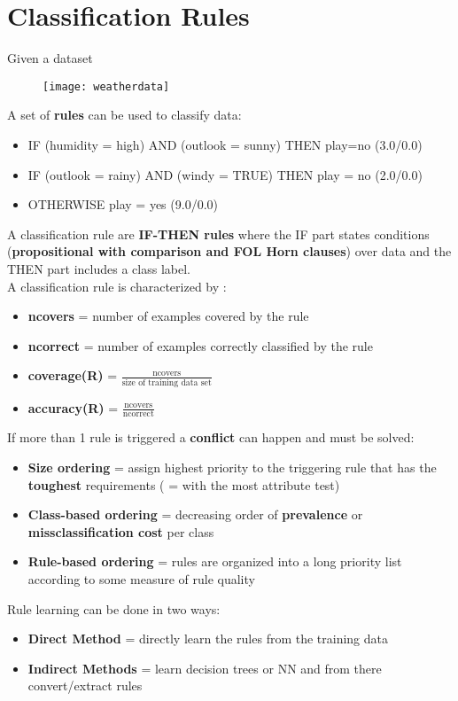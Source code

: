 \newpage
\section{Classification Rules}
Given a dataset
\begin{figure}[H]
  \centering
  \texttt{[image: weatherdata]}
\end{figure}
A set of \textbf{rules} can be used to classify data:
\begin{itemize}
\item IF (humidity = high) AND (outlook = sunny) THEN play=no (3.0/0.0)
\item IF (outlook = rainy) AND (windy = TRUE) THEN play = no (2.0/0.0)
\item OTHERWISE play = yes (9.0/0.0)
\end{itemize}
A classification rule are \textbf{IF-THEN rules} where the IF part states conditions (\textbf{propositional with comparison and FOL Horn clauses}) over data and the THEN part includes a class label. \\
A classification rule is characterized by :
\begin{itemize}
\item \textbf{ncovers} = number of examples covered by the rule
\item \textbf{ncorrect} = number of examples correctly classified by the rule
\item \textbf{coverage(R)} = $\frac{\text{ncovers}}{\text{size of training data set}}$
\item \textbf{accuracy(R)} = $\frac{\text{ncovers}}{\text{ncorrect}}$
\end{itemize}
If more than 1 rule is triggered a \textbf{conflict} can happen and must be solved:
\begin{itemize}
\item \textbf{Size ordering} = assign highest priority to the triggering rule that has the \textbf{toughest} requirements ( = with the most attribute test)
\item \textbf{Class-based ordering} = decreasing order of \textbf{prevalence} or \textbf{missclassification cost} per class
\item \textbf{Rule-based ordering} = rules are organized into a long priority list according to some measure of rule quality
\end{itemize}
Rule learning can be done in two ways:
\begin{itemize}
\item \textbf{Direct Method} = directly learn the rules from the training data
\item \textbf{Indirect Methods} = learn decision trees or NN and from there convert/extract rules
\end{itemize}

